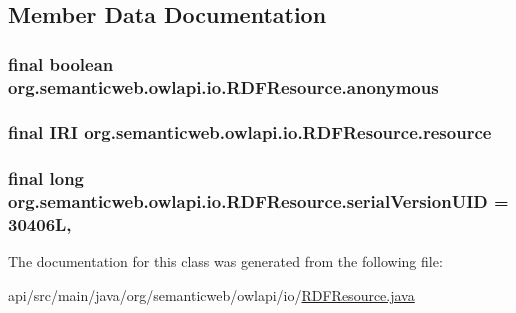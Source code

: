 \subsection{Member Data Documentation}
\hypertarget{classorg_1_1semanticweb_1_1owlapi_1_1io_1_1_r_d_f_resource_aaf68492e57a6adddbd41ffa5e9e45713}{
\subsubsection[{anonymous}]{\setlength{\rightskip}{0pt plus 5cm}final boolean org.\-semanticweb.\-owlapi.\-io.\-R\-D\-F\-Resource.\-anonymous\hspace{0.3cm}{\ttfamily [private]}}}\label{classorg_1_1semanticweb_1_1owlapi_1_1io_1_1_r_d_f_resource_aaf68492e57a6adddbd41ffa5e9e45713}
\hypertarget{classorg_1_1semanticweb_1_1owlapi_1_1io_1_1_r_d_f_resource_aca318e939b6a59be242e42f397f6aa6f}{
\subsubsection[{resource}]{\setlength{\rightskip}{0pt plus 5cm}final {\bf I\-R\-I} org.\-semanticweb.\-owlapi.\-io.\-R\-D\-F\-Resource.\-resource\hspace{0.3cm}{\ttfamily [private]}}}\label{classorg_1_1semanticweb_1_1owlapi_1_1io_1_1_r_d_f_resource_aca318e939b6a59be242e42f397f6aa6f}
\hypertarget{classorg_1_1semanticweb_1_1owlapi_1_1io_1_1_r_d_f_resource_a438450dfd3fbe2b820b881ebecc0bf8c}{
\subsubsection[{serial\-Version\-U\-I\-D}]{\setlength{\rightskip}{0pt plus 5cm}final long org.\-semanticweb.\-owlapi.\-io.\-R\-D\-F\-Resource.\-serial\-Version\-U\-I\-D = 30406\-L\hspace{0.3cm}{\ttfamily [static]}, {\ttfamily [private]}}}\label{classorg_1_1semanticweb_1_1owlapi_1_1io_1_1_r_d_f_resource_a438450dfd3fbe2b820b881ebecc0bf8c}


The documentation for this class was generated from the following file\-:\begin{DoxyCompactItemize}
\item 
api/src/main/java/org/semanticweb/owlapi/io/\hyperlink{_r_d_f_resource_8java}{R\-D\-F\-Resource.\-java}\end{DoxyCompactItemize}

